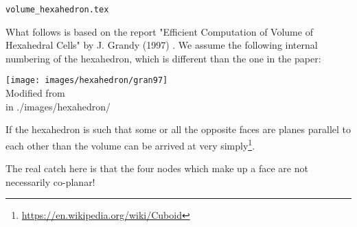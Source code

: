 \begin{flushright} {\tiny {\color{gray} \tt volume\_hexahedron.tex}} \end{flushright}

What follows is based on the report "Efficient Computation of Volume of
Hexahedral Cells" by J. Grandy (1997) \cite{gran97}.
We assume the following internal numbering of the hexahedron,
which is different than the one in the paper: 

\begin{center}
\texttt{[image: images/hexahedron/gran97]}\\
{\captionfont Modified from \cite{gran97}}\\
{\tiny {\color{gray} in ./images/hexahedron/}}
\end{center}

If the hexahedron is such that some or all the opposite faces are planes parallel to 
each other than the volume can be arrived at very 
simply\footnote{\url{https://en.wikipedia.org/wiki/Cuboid}}.

The real catch here is that the four nodes which make up a face are not 
necessarily co-planar!  

